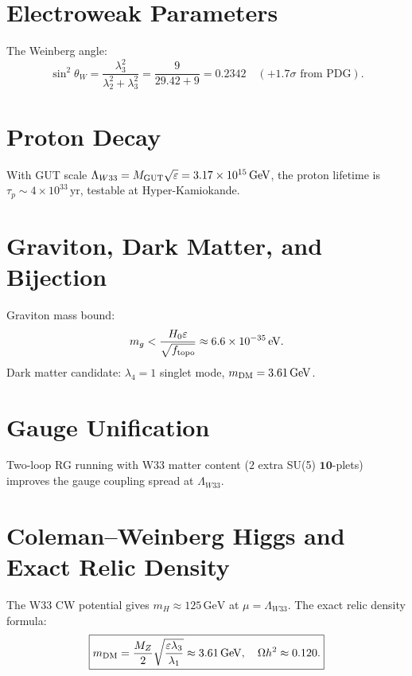 \documentclass[11pt,a4paper]{article}
\begin{document}
\section{Electroweak Parameters}

The Weinberg angle:
\begin{equation}
  \sin^2\theta_W = \frac{\lambda_3^2}{\lambda_2^2 + \lambda_3^2}
  = \frac{9}{29.42+9} = 0.2342 \quad (+1.7\sigma \text{ from PDG}).
\end{equation}

\section{Proton Decay}

With GUT scale $\Lambda_{W33} = M_{\rm GUT}\sqrt{\varepsilon} = 3.17\times10^{15}\,\mathrm{GeV}$,
the proton lifetime is $\tau_p \sim 4\times10^{33}\,\mathrm{yr}$,
testable at Hyper-Kamiokande.

\section{Graviton, Dark Matter, and Bijection}

Graviton mass bound:
\begin{equation}
  m_g < \frac{H_0 \varepsilon}{\sqrt{f_{\rm topo}}} \approx 6.6\times10^{-35}\,\mathrm{eV}.
\end{equation}
Dark matter candidate: $\lambda_4=1$ singlet mode, $m_{\rm DM}=3.61\,\mathrm{GeV}$.

\section{Gauge Unification}

Two-loop RG running with W33 matter content ($2$ extra SU(5) $\mathbf{10}$-plets)
improves the gauge coupling spread at $\Lambda_{W33}$.

\section{Coleman--Weinberg Higgs and Exact Relic Density}

The W33 CW potential gives $m_H \approx 125\,\mathrm{GeV}$ at
$\mu = \Lambda_{W33}$. The exact relic density formula:
\begin{equation}
  \boxed{m_{\rm DM} = \frac{M_Z}{2}\sqrt{\frac{\varepsilon\lambda_3}{\lambda_1}}
  \approx 3.61\,\mathrm{GeV}, \quad \Omega h^2 \approx 0.120.}
\end{equation}
\end{document}
